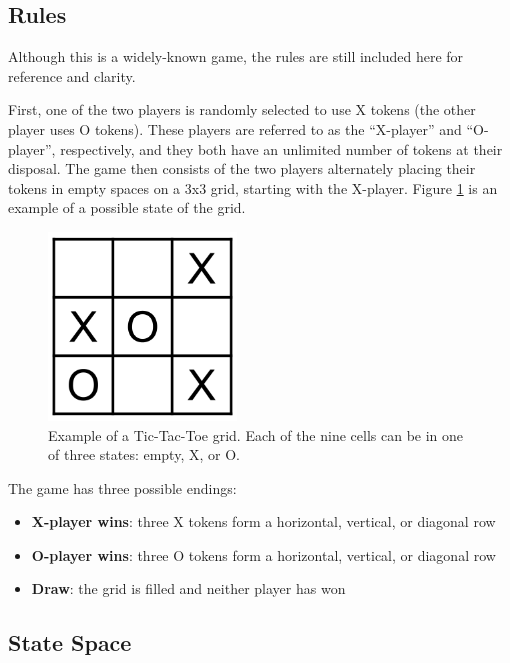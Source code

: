 \documentclass[11pt,a4paper]{report}
\begin{document}
\subsection{Rules}

Although this is a widely-known game, the rules \cite{tic-tac-toe-rules} are still included here for reference and clarity.

First, one of the two players is randomly selected to use X tokens (the other player uses O tokens). These players are referred to as the ``X-player'' and ``O-player'', respectively, and they both have an unlimited number of tokens at their disposal. The game then consists of the two players alternately placing their tokens in empty spaces on a 3x3 grid, starting with the X-player. Figure \ref{tic-tac-toe-grid-example} is an example of a possible state of the grid.

\begin{figure}[htbp]
	\begin{center}
		\includegraphics[width=50mm]{tictactoe_grid_example.png}
		\caption{Example of a Tic-Tac-Toe grid. Each of the nine cells can be in one of three states: empty, X, or O.}
		\label{tic-tac-toe-grid-example}
	\end{center}
\end{figure}

The game has three possible endings:

\begin{itemize}
	\item \textbf{X-player wins}: three X tokens form a horizontal, vertical, or diagonal row
	\item \textbf{O-player wins}: three O tokens form a horizontal, vertical, or diagonal row
	\item \textbf{Draw}: the grid is filled and neither player has won
\end{itemize}


\subsection{State Space}
\label{sec:TicTacToeStateSpace}
\end{document}
